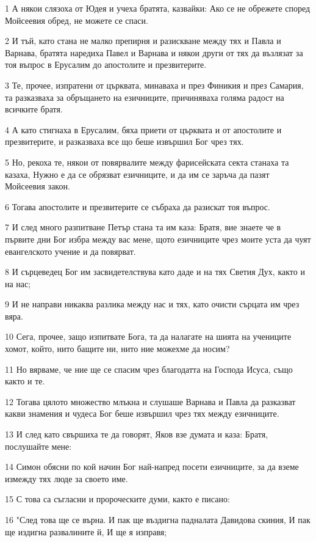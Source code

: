 \par 1 А някои слязоха от Юдея и учеха братята, казвайки: Ако се не обрежете според Мойсеевия обред, не можете се спаси.
\par 2 И тъй, като стана не малко препирня и разискване между тях и Павла и Варнава, братята наредиха Павел и Варнава и някои други от тях да възлязат за тоя въпрос в Ерусалим до апостолите и презвитерите.
\par 3 Те, прочее, изпратени от църквата, минаваха и през Финикия и през Самария, та разказваха за обръщането на езичниците, причиняваха голяма радост на всичките братя.
\par 4 А като стигнаха в Ерусалим, бяха приети от църквата и от апостолите и презвитерите, и разказваха все що беше извършил Бог чрез тях.
\par 5 Но, рекоха те, някои от повярвалите между фарисейската секта станаха та казаха, Нужно е да се обрязват езичниците, и да им се заръча да пазят Мойсеевия закон.
\par 6 Тогава апостолите и презвитерите се събраха да разискат тоя въпрос.
\par 7 И след много разпитване Петър стана та им каза: Братя, вие знаете че в първите дни Бог избра между вас мене, щото езичниците чрез моите уста да чуят евангелското учение и да повярват.
\par 8 И сърцеведец Бог им засвидетелствува като даде и на тях Светия Дух, както и на нас;
\par 9 И не направи никаква разлика между нас и тях, като очисти сърцата им чрез вяра.
\par 10 Сега, прочее, защо изпитвате Бога, та да налагате на шията на учениците хомот, който, нито бащите ни, нито ние можехме да носим?
\par 11 Но вярваме, че ние ще се спасим чрез благодатта на Господа Исуса, също както и те.
\par 12 Тогава цялото множество млъкна и слушаше Варнава и Павла да разказват какви знамения и чудеса Бог беше извършил чрез тях между езичниците.
\par 13 И след като свършиха те да говорят, Яков взе думата и каза: Братя, послушайте мене:
\par 14 Симон обясни по кой начин Бог най-напред посети езичниците, за да вземе измежду тях люде за своето име.
\par 15 С това са съгласни и пророческите думи, както е писано:
\par 16 "След това ще се върна. И пак ще въздигна падналата Давидова скиния, И пак ще издигна развалините й, И ще я изправя;
